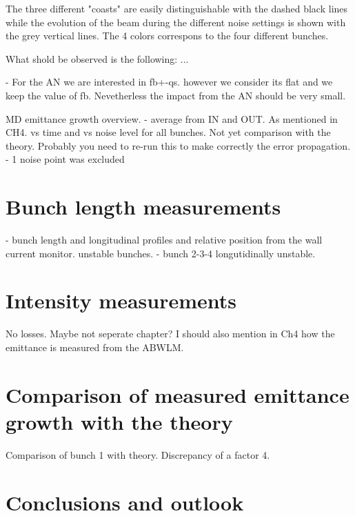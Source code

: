 The three different "coasts" are easily distinguishable with the dashed black lines while the evolution of the beam during the different noise settings is shown with the grey vertical lines. The 4 colors correspons to the four different bunches. 

What shold be observed is the following: ...



- For the AN we are interested in fb+-qs. however we consider its flat and we keep the value of fb. Nevetherless the impact from the AN should be very small.

MD emittance growth overview. 
    - average from IN and OUT. As mentioned in CH4. vs time and vs noise level for all bunches. Not yet comparison with the theory. Probably you need to re-run this to make correctly the error propagation. 
    - 1 noise point was excluded
 


\section{Bunch length measurements}\label{sec:bunch_length_measurements_2018}
    - bunch length and longitudinal profiles and relative position from the wall current monitor.  unstable bunches.
    - bunch 2-3-4 longutidinally unstable.
 
\section{Intensity measurements}\label{sec:intensity_measurements_2018}
No losses. Maybe not seperate chapter?
I should also mention in Ch4 how the emittance is measured from the ABWLM.

\section{Comparison of measured emittance growth with the theory}\label{sec:meas_2018_vs_theory}

Comparison of bunch 1 with theory. Discrepancy of a factor 4.


 \section{Conclusions and outlook}\label{sec:MD2018_summary}
